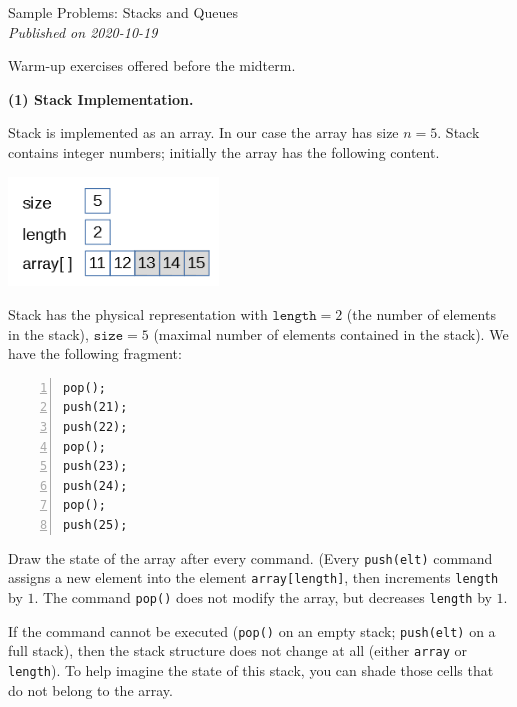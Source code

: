 \documentclass[a4paper,12pt]{article}
\begin{document}
\thispagestyle{empty}

\twocolumn

\begin{center}
{\Large Sample Problems: Stacks and Queues}\\
{\em Published on 2020-10-19}
\end{center}

Warm-up exercises offered before the midterm.

\vspace{10pt}
{\bf \large (1) Stack Implementation.} 

Stack is implemented as an array. In our case the array has size $n = 5$. 
Stack contains integer numbers; initially the array has 
the following content.

\includegraphics[width=2.2in]{sample-stacks-queues/stack-structure.png}

Stack has the physical representation with $\mathtt{length}=2$
(the number of elements in the stack), $\mathtt{size}=5$ (maximal number of elements
contained in the stack). We have the following fragment:

\begin{center}
\begin{minipage}{.8\columnwidth}
\begin{Verbatim}[frame=single,numbers=left]
pop();
push(21);
push(22);
pop();
push(23);
push(24);
pop();
push(25);
\end{Verbatim}
\end{minipage}
\end{center}


Draw the state of the array after every command. 
(Every {\tt push(elt)} command assigns a new element into the element {\tt array[length]}, 
then increments {\tt length} by $1$.
The command {\tt pop()} does not modify the array, but decreases {\tt length} by $1$. 

If the command cannot be executed ({\tt pop()} on an empty stack; {\tt push(elt)} on a full stack), 
then the stack structure does not change at all (either {\tt array} or {\tt length}). 
To help imagine the state of this stack, you can shade those cells that do not belong to the array.
\end{document}
